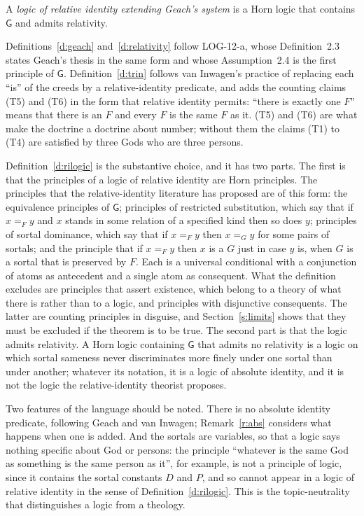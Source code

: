 \documentclass{situationist-preprint}
\begin{document}
\begin{definition}\label{d:rilogic}
A \emph{logic of relative identity extending Geach's system} is a Horn logic that contains $\mathsf{G}$ and admits relativity.
\end{definition}

Definitions~\ref{d:geach} and~\ref{d:relativity} follow LOG-12-a, whose Definition~2.3 states Geach's thesis in the same form and whose Assumption~2.4 is the first principle of $\mathsf{G}$. Definition~\ref{d:trin} follows van Inwagen's practice of replacing each \enquote{is} of the creeds by a relative-identity predicate, and adds the counting claims (T5) and (T6) in the form that relative identity permits: \enquote{there is exactly one $F$} means that there is an $F$ and every $F$ is the same $F$ as it. (T5) and (T6) are what make the doctrine a doctrine about number; without them the claims (T1) to (T4) are satisfied by three Gods who are three persons.

Definition~\ref{d:rilogic} is the substantive choice, and it has two parts. The first is that the principles of a logic of relative identity are Horn principles. The principles that the relative-identity literature has proposed are of this form: the equivalence principles of $\mathsf{G}$; principles of restricted substitution, which say that if $x =_F y$ and $x$ stands in some relation of a specified kind then so does $y$; principles of sortal dominance, which say that if $x =_F y$ then $x =_G y$ for some pairs of sortals; and the principle that if $x =_F y$ then $x$ is a $G$ just in case $y$ is, when $G$ is a sortal that is preserved by $F$. Each is a universal conditional with a conjunction of atoms as antecedent and a single atom as consequent. What the definition excludes are principles that assert existence, which belong to a theory of what there is rather than to a logic, and principles with disjunctive consequents. The latter are counting principles in disguise, and Section~\ref{s:limits} shows that they must be excluded if the theorem is to be true. The second part is that the logic admits relativity. A Horn logic containing $\mathsf{G}$ that admits no relativity is a logic on which sortal sameness never discriminates more finely under one sortal than under another; whatever its notation, it is a logic of absolute identity, and it is not the logic the relative-identity theorist proposes.

Two features of the language should be noted. There is no absolute identity predicate, following Geach and van Inwagen; Remark~\ref{r:abs} considers what happens when one is added. And the sortals are variables, so that a logic says nothing specific about God or persons: the principle \enquote{whatever is the same God as something is the same person as it}, for example, is not a principle of logic, since it contains the sortal constants $D$ and $P$, and so cannot appear in a logic of relative identity in the sense of Definition~\ref{d:rilogic}. This is the topic-neutrality that distinguishes a logic from a theology.
\end{document}

